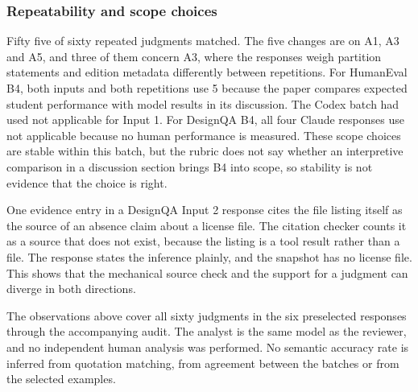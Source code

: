 \subsubsection{Repeatability and scope choices}
Fifty five of sixty repeated judgments matched. The five changes are on A1, A3 and A5, and three of them concern A3, where the responses weigh partition statements and edition metadata differently between repetitions. For HumanEval B4, both inputs and both repetitions use 5 because the paper compares expected student performance with model results in its discussion. The Codex batch had used not applicable for Input 1. For DesignQA B4, all four Claude responses use not applicable because no human performance is measured. These scope choices are stable within this batch, but the rubric does not say whether an interpretive comparison in a discussion section brings B4 into scope, so stability is not evidence that the choice is right.

One evidence entry in a DesignQA Input 2 response cites the file listing itself as the source of an absence claim about a license file. The citation checker counts it as a source that does not exist, because the listing is a tool result rather than a file. The response states the inference plainly, and the snapshot has no license file. This shows that the mechanical source check and the support for a judgment can diverge in both directions.

The observations above cover all sixty judgments in the six preselected responses through the accompanying audit. The analyst is the same model as the reviewer, and no independent human analysis was performed. No semantic accuracy rate is inferred from quotation matching, from agreement between the batches or from the selected examples.
